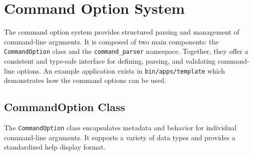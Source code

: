 \section{Command Option System}
\label{sec:cmd-option-system}

The command option system provides structured parsing and management of command-line arguments. It is composed of two main components: the \texttt{CommandOption} class and the \texttt{command\_parser} namespace. Together, they offer a consistent and type-safe interface for defining, parsing, and validating command-line options. An example application exists in \texttt{bin/apps/template} which demonstrates how the command options can be used.

\subsection{CommandOption Class}

The \texttt{CommandOption} class encapsulates metadata and behavior for individual command-line arguments. It supports a variety of data types and provides a standardized help display format.

